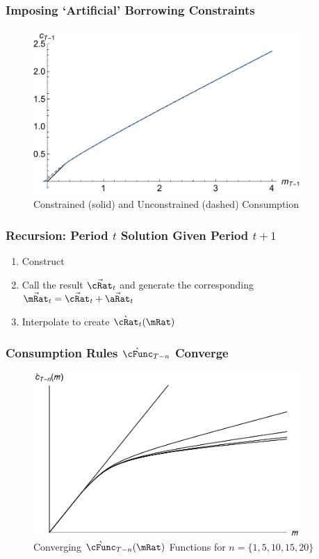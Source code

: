 \documentclass{beamer}
\begin{document}
\begin{frame}
\frametitle{Imposing `Artificial' Borrowing Constraints}
\begin{figure}
\includegraphics[width=4in]{./Figures/cVScCon.pdf}
        \caption{Constrained (solid) and Unconstrained (dashed) Consumption}
        \label{fig:cVScCon}
\end{figure}

\end{frame}

\begin{frame}%
\frametitle{Recursion: Period $t$ Solution Given Period $t+1$}
\begin{enumerate}
\item Construct 

\item Call the result $\vec{\cRat}_{t}$ and generate the corresponding $\vec{\mRat}_{t}=\vec{\cRat}_{t}+\vec{\aRat}_{t}$
\item Interpolate to create $\grave{\cRat}_{t}(\mRat)$
\end{enumerate}

\end{frame}

\begin{frame}%
\frametitle{Consumption Rules $\grave{\cFunc}_{T-n}$ Converge}

\begin{figure}
        \includegraphics[width=4in]{./Figures/PlotCFuncsConverge.pdf}
        \caption{Converging $\grave{\cFunc}_{T-n}({\mRat})$ Functions for $n=\{1,5,10,15,20\}$}
        \label{fig:PlotCFuncsConverge}
\end{figure}

\end{frame}
\end{document}
